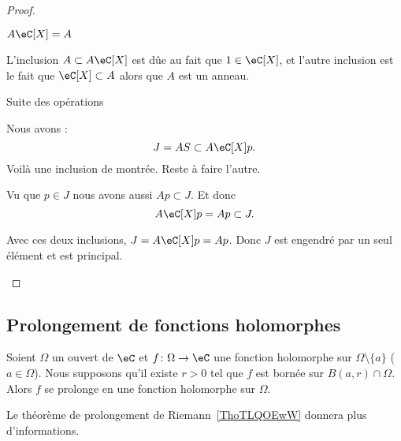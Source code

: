 \begin{proof}
\begin{subproof}
		\item[\( A\eC\lbrack X\rbrack=A\)]

		L'inclusion \( A\subset A\eC[X]\) est dûe au fait que \( 1\in \eC[X]\), et l'autre inclusion est le fait que \( \eC[X]\subset A\) alors que \( A\) est un anneau.

		\item[Suite des opérations]

		Nous avons :
		\begin{equation}
			J=AS\subset A\eC[X]p.
		\end{equation}
		Voilà une inclusion de montrée. Reste à faire l'autre.

		Vu que \( p\in J\) nous avons aussi \( Ap\subset J\). Et donc
		\begin{equation}
			A\eC[X]p = Ap\subset J.
		\end{equation}

		Avec ces deux inclusions, \( J=A\eC[X]p=Ap\). Donc \( J\) est engendré par un seul élément et est principal.
	\end{subproof}
\end{proof}

\subsection{Prolongement de fonctions holomorphes}

\begin{proposition} \label{PropDRnYkKP}
	Soient \( \Omega\) un ouvert de \( \eC\) et \( f\colon \Omega\to \eC\) une fonction holomorphe sur \( \Omega\setminus\{ a \}\) (\( a\in \Omega\)). Nous supposons qu'il existe \( r>0\) tel que \( f\) est bornée sur \( B(a,r)\cap\Omega\). Alors \( f\) se prolonge en une fonction holomorphe sur \( \Omega\).
\end{proposition}
Le théorème de prolongement de Riemann~\ref{ThoTLQOEwW} donnera plus d'informations.

